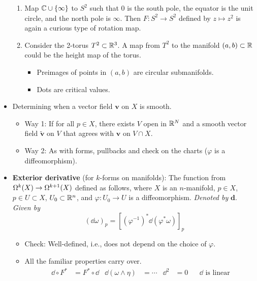\documentclass[../notes.tex]{subfiles}
\begin{document}
\begin{itemize}
\begin{enumerate}
        \item Map $\C\cup\{\infty\}$ to $S^2$ such that 0 is the south pole, the equator is the unit circle, and the north pole is $\infty$. Then $F:S^2\to S^2$ defined by $z\mapsto z^2$ is again a curious type of rotation map.
        \item Consider the 2-torus $T^2\subset\R^3$. A map from $T^2$ to the manifold $(a,b)\subset\R$ could be the height map of the torus.
        \begin{itemize}
            \item Preimages of points in $(a,b)$ are circular submanifolds.
            \item Dots are critical values.
        \end{itemize}
    \end{enumerate}
    \item Determining when a vector field $\bm{v}$ on $X$ is smooth.
    \begin{itemize}
        \item Way 1: If for all $p\in X$, there exists $V$ open in $\R^N$ and a smooth vector field $\tilde{\bm{v}}$ on $V$ that agrees with $\bm{v}$ on $V\cap X$.
        \item Way 2: As with forms, pullbacks and check on the charts ($\varphi$ is a diffeomorphism).
    \end{itemize}
    \item \textbf{Exterior derivative} (for $k$-forms on manifolds): The function from $\ome[k]{X}\to\ome[k+1]{X}$ defined as follows, where $X$ is an $n$-manifold, $p\in X$, $p\in U\subset X$, $U_0\subset\R^n$, and $\varphi:U_0\to U$ is a diffeomorphism. \emph{Denoted by} $\pmb{\mathbf{d}}$. \emph{Given by}
    \begin{equation*}
        (\dd\omega)_p = [(\varphi^{-1})^*\dd(\varphi^*\omega)]_p
    \end{equation*}
    \begin{itemize}
        \item Check: Well-defined, i.e., does not depend on the choice of $\varphi$.
        \item All the familiar properties carry over.
        \begin{align*}
            \dd\circ F^* &= F^*\circ\dd&
            \dd(\omega\wedge\eta) &= \cdots&
            \dd^2 &= 0&
            &\dd\text{ is linear}
        \end{align*}
    \end{itemize}
\end{itemize}
\end{document}
